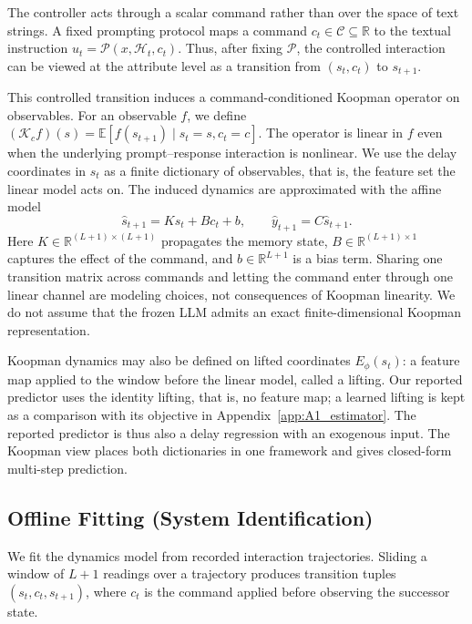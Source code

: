 The controller acts through a scalar command rather than over the
space of text strings. A fixed prompting protocol maps a command
$c_t\in\mathcal{C}\subseteq\mathbb{R}$ to the textual instruction
$u_t=\mathcal{P}(x,\mathcal{H}_t,c_t)$. Thus, after fixing
$\mathcal{P}$, the controlled interaction can be viewed at the attribute
level as a transition from $(s_t,c_t)$ to $s_{t+1}$.

This controlled transition induces a command-conditioned Koopman operator
on observables. For an observable $f$, we define
$(\mathcal{K}_c f)(s)
=
\mathbb{E}[f(s_{t+1})\mid s_t=s,c_t=c]$.
The operator is linear in $f$ even when the underlying prompt--response
interaction is nonlinear. We use the delay coordinates in $s_t$ as a finite
dictionary of observables, that is, the feature set the linear model acts on.
The induced dynamics are approximated with the
affine model
\begin{equation}
    \widehat{s}_{t+1}
    =
    K s_t+B c_t+b,
    \qquad
    \widehat{y}_{t+1}
    =
    C\widehat{s}_{t+1}.
    \label{eq:koopman_model}
\end{equation}
Here $K\in\mathbb{R}^{(L+1)\times(L+1)}$ propagates the memory state,
$B\in\mathbb{R}^{(L+1)\times 1}$ captures the effect of the command, and
$b\in\mathbb{R}^{L+1}$ is a bias term. Sharing one transition matrix across
commands and letting the command enter through one linear channel are
modeling choices, not consequences of Koopman linearity. We do not assume
that the frozen LLM admits an exact finite-dimensional Koopman representation.

Koopman dynamics may also be defined on lifted coordinates $E_\phi(s_t)$:
a feature map applied to the window before the linear model, called a
lifting. Our reported predictor uses the identity lifting, that is, no
feature map; a learned lifting is kept as a comparison with its objective in
Appendix~\ref{app:A1_estimator}. The reported predictor is thus also a delay
regression with an exogenous input. The Koopman view places both dictionaries in one framework and
gives closed-form multi-step prediction.


\subsection{Offline Fitting (System Identification)}
\label{sec:learning}

We fit the dynamics model from recorded interaction trajectories. Sliding a
window of $L+1$ readings over a trajectory produces transition tuples
$(s_t,c_t,s_{t+1})$, where $c_t$ is the command applied before observing the
successor state.

